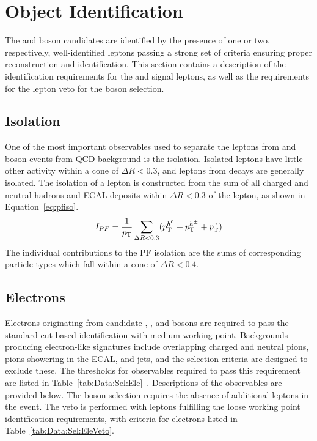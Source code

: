 \section{Object Identification}\label{ch:IdIso}
The \W and \Z boson candidates are identified by the presence of one or two, respectively, well-identified leptons passing a strong set of criteria ensuring proper reconstruction and identification. This section contains a description of the identification requirements for the \wlnu and \zll signal leptons, as well as the requirements for the lepton veto for the \Wpm boson selection.

\subsection{Isolation}\label{ch:id:iso}
One of the most important observables used to separate the leptons from \Wp and \Wm boson events from QCD background is the isolation. Isolated leptons have little other activity within a cone of $\Delta R < 0.3$, and leptons from \wlnu decays are generally isolated. The isolation of a lepton is constructed from the sum of all charged and neutral hadrons and ECAL deposits within $\Delta R < 0.3$ of the lepton, as shown in Equation~\ref{eq:pfiso}. 
\begin{equation}
    I_{PF} = \frac{1}{p_{\mathrm{T}}}\sum_{\Delta R<0.3}( p_{\mathrm{T}}^{h^0} + p_{\mathrm{T}}^{h^\pm} +  p_{\mathrm{T}}^{\gamma})
    \label{eq:pfiso}
\end{equation}
The individual contributions to the PF isolation are the sums of corresponding particle types which fall within a cone of $\Delta R < 0.4$.

\subsection{Electrons}\label{ch:IdIso:Ele}
Electrons originating from candidate \Wp, \Wm, and \Z bosons are required to pass the standard cut-based identification with medium working point. Backgrounds producing electron-like signatures include overlapping charged and neutral pions, pions showering in the ECAL, and jets, and the selection criteria are designed to exclude these. The thresholds for observables required to pass this requirement are listed in Table~\ref{tab:Data:Sel:Ele}~\cite{EgammaIDIsoCuts}. Descriptions of the observables are provided below. The \Wpm boson selection requires the absence of additional leptons in the event. The veto is performed with leptons fulfilling the loose working point identification requirements, with criteria for electrons listed in Table~\ref{tab:Data:Sel:EleVeto}. 
